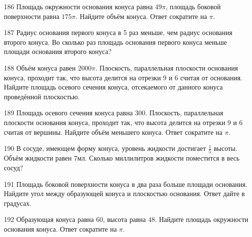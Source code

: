 \documentclass[a4paper]{article}
\begin{document}
\begin{taskBN}{186}
Площадь окружности основания конуса равна $49\pi$, площадь боковой поверхности равна $175\pi$. Найдите объём конуса. Ответ сократите на $\pi$.
\end{taskBN}

\begin{taskBN}{187}
Радиус основания первого конуса в 5 раз меньше, чем радиус основания второго конуса. Во сколько раз площадь основания первого конуса меньше площади основания второго конуса?
\end{taskBN}

\begin{taskBN}{188}
Объём конуса равен $2000\pi$. Плоскость, параллельная плоскости основания конуса,  проходит так, что высота делится на отрезки $9$ и $6$ считая от основания. Найдите площадь осевого сечения конуса, отсекаемого от данного конуса проведённой плоскостью. 
\end{taskBN}

\begin{taskBN}{189}
Площадь осевого сечения конуса равна $300$. Плоскость, параллельная плоскости основания конуса,  проходит так, что высота делится на отрезки $9$ и $6$ считая от вершины. Найдите объём меньшего конуса. Ответ сократите на $\pi$.
\end{taskBN}

\begin{taskBN}{190}
В сосуде, имеющем форму конуса, уровень жидкости достигает $\frac{1}{5}$ высоты. Объём жидкости равен 7мл. Сколько миллилитров жидкости поместится в весь сосуд?
\end{taskBN}

\begin{taskBN}{191}
Площадь боковой поверхности конуса в два раза больше площади основания. Найдите угол между образующей конуса и плоскостью основания. Ответ дайте в градусах.
\end{taskBN}

\begin{taskBN}{192}
Образующая конуса равна $60$, высота равна $48$. Найдите площадь окружности основания конуса. Ответ сократите на $\pi$.
\end{taskBN}
\end{document}

